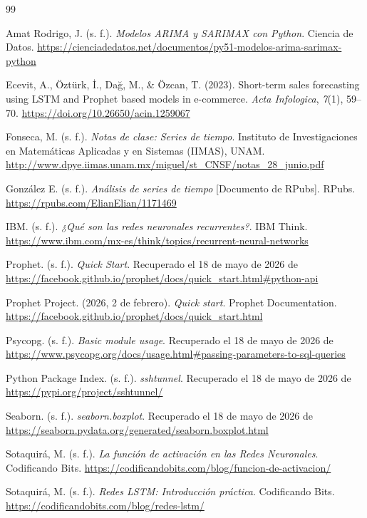 \documentclass[11pt,a4paper]{report}
\begin{document}
    
\begin{thebibliography}{99}

Amat Rodrigo, J. (s. f.). \textit{Modelos ARIMA y SARIMAX con Python}. Ciencia de Datos. \url{https://cienciadedatos.net/documentos/py51-modelos-arima-sarimax-python}

Ecevit, A., Öztürk, İ., Dağ, M., \& Özcan, T. (2023). Short-term sales forecasting using LSTM and Prophet based models in e-commerce. \textit{Acta Infologica}, \textit{7}(1), 59–70. \url{https://doi.org/10.26650/acin.1259067}

Fonseca, M. (s. f.). \textit{Notas de clase: Series de tiempo}. Instituto de Investigaciones en Matemáticas Aplicadas y en Sistemas (IIMAS), UNAM. \url{http://www.dpye.iimas.unam.mx/miguel/st_CNSF/notas_28_junio.pdf}

González E. (s. f.). \textit{Análisis de series de tiempo} [Documento de RPubs]. RPubs. \url{https://rpubs.com/ElianElian/1171469}

IBM. (s. f.). \textit{¿Qué son las redes neuronales recurrentes?}. IBM Think. \url{https://www.ibm.com/mx-es/think/topics/recurrent-neural-networks}

Prophet. (s. f.). \textit{Quick Start}. Recuperado el 18 de mayo de 2026 de \url{https://facebook.github.io/prophet/docs/quick_start.html#python-api}

Prophet Project. (2026, 2 de febrero). \textit{Quick start}. Prophet Documentation. \url{https://facebook.github.io/prophet/docs/quick_start.html}

Psycopg. (s. f.). \textit{Basic module usage}. Recuperado el 18 de mayo de 2026 de \url{https://www.psycopg.org/docs/usage.html#passing-parameters-to-sql-queries}

Python Package Index. (s. f.). \textit{sshtunnel}. Recuperado el 18 de mayo de 2026 de \url{https://pypi.org/project/sshtunnel/}

Seaborn. (s. f.). \textit{seaborn.boxplot}. Recuperado el 18 de mayo de 2026 de \url{https://seaborn.pydata.org/generated/seaborn.boxplot.html}

Sotaquirá, M. (s. f.). \textit{La función de activación en las Redes Neuronales}. Codificando Bits. \url{https://codificandobits.com/blog/funcion-de-activacion/}

Sotaquirá, M. (s. f.). \textit{Redes LSTM: Introducción práctica}. Codificando Bits. \url{https://codificandobits.com/blog/redes-lstm/}


\end{thebibliography}
\end{document}

